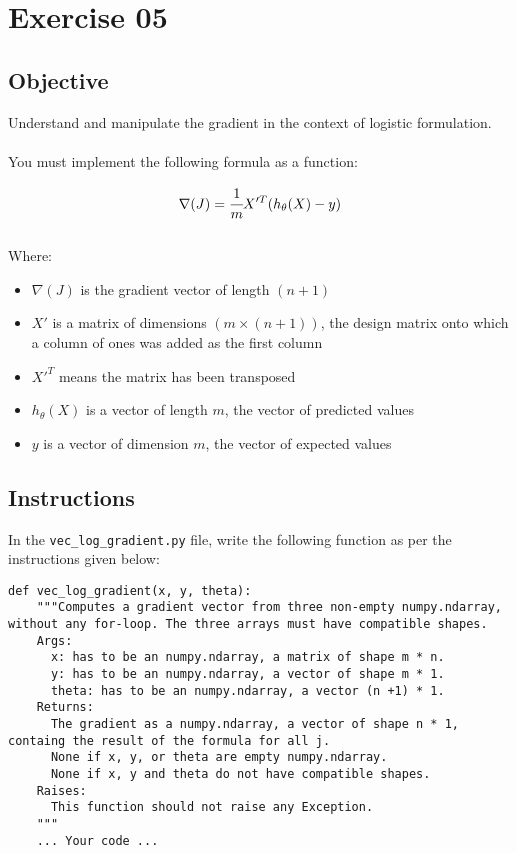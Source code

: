 \chapter{Exercise 05}

\newpage
{}
\makeheaderfilesforbidden

\section*{Objective}
Understand and manipulate the gradient in the context of logistic formulation.\\
\\
You must implement the following formula as a function:

$$
\nabla(J) = \cfrac{1}{m} X'^T(h_\theta(X) - y)
$$  
\\
Where:  
\begin{itemize}
  \item $\nabla(J)$ is the gradient vector of length $(n + 1)$
  \item $X'$ is a matrix of dimensions $(m \times (n + 1))$, the design matrix onto which a column of ones was added as the first column
  \item $X'^T$ means the matrix has been transposed
  \item $h_\theta(X)$ is a vector of length $m$, the vector of predicted values
  \item $y$ is a vector of dimension $m$, the vector of expected values
\end{itemize}


\section*{Instructions}
In the \texttt{vec\_log\_gradient.py} file, write the following function as per the instructions given below:
\\
\par
\begin{verbatim}
def vec_log_gradient(x, y, theta):
    """Computes a gradient vector from three non-empty numpy.ndarray, without any for-loop. The three arrays must have compatible shapes.
    Args:
      x: has to be an numpy.ndarray, a matrix of shape m * n.
      y: has to be an numpy.ndarray, a vector of shape m * 1.
      theta: has to be an numpy.ndarray, a vector (n +1) * 1.
    Returns:
      The gradient as a numpy.ndarray, a vector of shape n * 1, containg the result of the formula for all j.
      None if x, y, or theta are empty numpy.ndarray.
      None if x, y and theta do not have compatible shapes.
    Raises:
      This function should not raise any Exception.
    """
    ... Your code ...
\end{verbatim}


